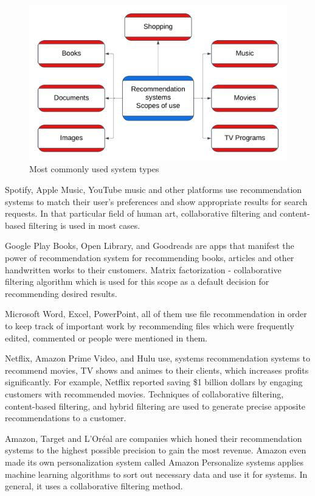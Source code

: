 \documentclass[10pt,twoside,english,a4paper]{article}
\begin{document}
\begin{figure}[h]
\centering
\includegraphics[width=1\textwidth]{system_types}
\caption{Most commonly used system types}
\label{fig:Types}
\end{figure}
\par Spotify, Apple Music, YouTube music and other platforms use recommendation systems to match their user's preferences and show appropriate results for search requests. In that particular field of human art, collaborative filtering and content-based filtering is used in most cases.\cite{music_rec}
\par Google Play Books, Open Library, and Goodreads are apps that manifest the power of recommendation system for recommending books, articles and other handwritten works to their customers. Matrix factorization - collaborative filtering algorithm which is used for this scope as a default decision for recommending desired results.\cite{book_rec}
\par Microsoft Word, Excel, PowerPoint, all of them use file recommendation in order to keep track of important work by recommending files which were frequently edited, commented or people were mentioned in them.\cite{file_rec} 
\par Netflix, Amazon Prime Video, and Hulu use, systems recommendation systems to recommend movies, TV shows and animes to their clients, which increases profits significantly. For example, Netflix reported saving \$1 billion dollars by engaging customers with recommended movies. Techniques of collaborative filtering, content-based filtering, and hybrid filtering are used to generate precise apposite recommendations to a customer.\cite{movie_rec}
\par Amazon, Target and L’Oréal are companies which honed their recommendation systems to the highest possible precision to gain the most revenue. Amazon even made its own personalization system called Amazon Personalize systems applies machine learning algorithms to sort out necessary data and use it for systems. In general, it uses a collaborative filtering method.\cite{shopping_rec}\cite{amazon_recsys}
\end{document}
